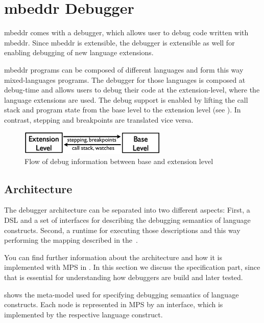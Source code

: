 \section{mbeddr Debugger}

mbeddr comes with a debugger, which allows user to debug code written
with mbeddr. Since mbeddr is extensible, the debugger is extensible as well for
enabling debugging of new language extensions.

mbeddr programs can be composed of different languages and form this way
mixed-languages programs. The debugger for those languages is composed at
debug-time and allows users to debug their code at the extension-level,
where the language extensions are used. The debug support is enabled by lifting
the call stack and program state from the base level to the extension level
(see ). In contrast, stepping and breakpoints are translated vice
versa.

\begin{figure}[h]
  \vspace{-2mm}
  \centering
    \includegraphics[width=7cm]{./figures/two-levels.png} 
    \vspace{-2mm}
    \caption{Flow of debug information between base and
    extension level~\cite{DBLP:conf/adaEurope/AdaEuropeDeb}}
  \label{infoFlow}
  \vspace{-2mm}
\end{figure}


\subsection{Architecture}

The debugger architecture can be separated into two different aspects: First, a
\ac{DSL} and a set of interfaces for describing the debugging semantics of
language constructs. Second, a runtime for executing those descriptions and this
way performing the mapping described in the~. 

You can find further information about the architecture and how it is
implemented with \ac{MPS} in \cite{DBLP:conf/adaEurope/AdaEuropeDeb}. In this
section we discuss the specification part, since that is essential for
understanding how debuggers are build and later tested.

 shows the meta-model used for specifying debugging semantics of
language constructs. Each node is represented in \ac{MPS} by an interface, which
is implemented by the respective language construct.

